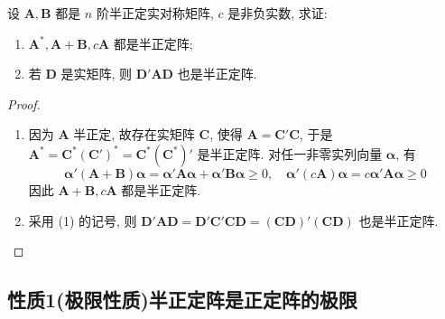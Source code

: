 \documentclass[../../main.tex]{subfiles}
\begin{document}
\begin{proposition}\label{proposition:半正定阵的相关性质}
设 \(\boldsymbol{A},\boldsymbol{B}\) 都是 \(n\) 阶半正定实对称矩阵, \(c\) 是非负实数, 求证:
\begin{enumerate}[(1)]
\item \(\boldsymbol{A}^*,\boldsymbol{A}+\boldsymbol{B},c\boldsymbol{A}\) 都是半正定阵;
\item 若 \(\boldsymbol{D}\) 是实矩阵, 则 \(\boldsymbol{D}'\boldsymbol{A}\boldsymbol{D}\) 也是半正定阵.
\end{enumerate}
\end{proposition}
\begin{proof}
\begin{enumerate}[(1)]
\item 因为 \(\boldsymbol{A}\) 半正定, 故存在实矩阵 \(\boldsymbol{C}\), 使得 \(\boldsymbol{A}=\boldsymbol{C}'\boldsymbol{C}\), 于是 \(\boldsymbol{A}^*=\boldsymbol{C}^*(\boldsymbol{C}')^*=\boldsymbol{C}^*(\boldsymbol{C}^*)'\) 是半正定阵. 对任一非零实列向量 \(\boldsymbol{\alpha}\), 有
\[\boldsymbol{\alpha}'(\boldsymbol{A}+\boldsymbol{B})\boldsymbol{\alpha}=\boldsymbol{\alpha}'\boldsymbol{A}\boldsymbol{\alpha}+\boldsymbol{\alpha}'\boldsymbol{B}\boldsymbol{\alpha}\geq0,\quad\boldsymbol{\alpha}'(c\boldsymbol{A})\boldsymbol{\alpha}=c\boldsymbol{\alpha}'\boldsymbol{A}\boldsymbol{\alpha}\geq0\]
因此 \(\boldsymbol{A}+\boldsymbol{B},c\boldsymbol{A}\) 都是半正定阵.
\item 采用 (1) 的记号, 则 \(\boldsymbol{D}'\boldsymbol{A}\boldsymbol{D}=\boldsymbol{D}'\boldsymbol{C}'\boldsymbol{C}\boldsymbol{D}=(\boldsymbol{C}\boldsymbol{D})'(\boldsymbol{C}\boldsymbol{D})\) 也是半正定阵.
\end{enumerate} 
\end{proof}

\subsection{{\heiti 性质1(极限性质)}半正定阵是正定阵的极限}
\end{document}
